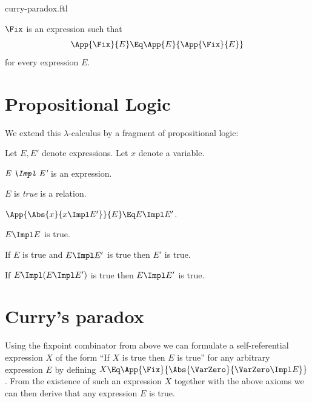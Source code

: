 \documentclass{stex}
\begin{document}
\begin{smodule}{curry-paradox.ftl}
\begin{forthel}
  \begin{signature*}[title=Fixed-point combinator,for=Fix]
    $\Fix$ is an expression such that
    \[\App{\Fix}{E} \Eq \App{E}{\App{\Fix}{E}}\]
    for every expression $E$.
  \end{signature*}
\end{forthel}


\section*{Propositional Logic}

\noindent We extend this $\lambda$-calculus by a fragment of propositional
logic:

\begin{forthel}  
  Let $E, E'$ denote expressions.
  Let $x$ denote a variable.

  \begin{signature*}[title=Implication,for=Impl]
    $\emph{E \Impl E'}$ is an expression.
  \end{signature*}

  \begin{signature*}[title=Truth,for=true]
    $E$ is \emph{true} is a relation.
  \end{signature*}

  \begin{axiom*}[title=$\beta$-reduction,name=beta reduction]
    $\App{\Abs{x}{x \Impl E'}}{E} \Eq E \Impl E'$.
  \end{axiom*}

  \begin{axiom*}[title=Reflexivity,name=reflexivity]
    $E \Impl E$ is true.
  \end{axiom*}

  \begin{axiom*}[title=Modus Ponens,name=modus ponens]
    If $E$ is true and $E \Impl E'$ is true then $E'$ is true.
  \end{axiom*}

  \begin{axiom*}[title=Strengthening,name=strengthening]
    If $E \Impl (E \Impl E')$ is true then $E \Impl E'$ is true.
  \end{axiom*}
\end{forthel}


\section*{Curry's paradox}

\noindent Using the fixpoint combinator from above we can formulate a 
self-referential expression $X$ of the form ``If $X$ is true then $E$ is
true'' for any arbitrary expression $E$ by defining
$X \Eq \App{\Fix}{\Abs{\VarZero}{\VarZero \Impl E}}$.
From the existence of such an expression $X$ together with the above axioms 
we can then derive that any expression $E$ is true.


\end{smodule}
\end{document}
